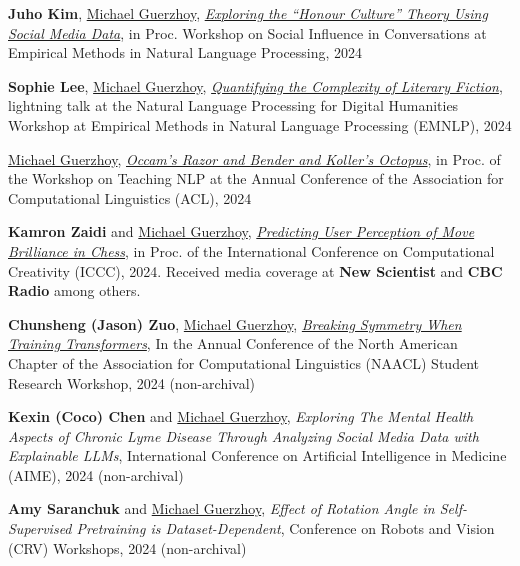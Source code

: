 \documentclass[letterpaper,11pt]{article}
\begin{document}
\begin{revnumerate}
\item \textbf{Juho Kim}, \underline{Michael Guerzhoy}, \href{https://aclanthology.org/2024.sicon-1.1/}{\textit{Exploring the ``Honour Culture'' Theory Using Social Media Data}}, in Proc. Workshop on Social Influence in Conversations at Empirical Methods in Natural Language Processing, 2024 

\item \textbf{Sophie Lee}, \underline{Michael Guerzhoy}, \href{https://zenodo.org/records/14029382}{\textit{Quantifying the Complexity of Literary Fiction}}, lightning talk at the  Natural Language Processing for Digital Humanities Workshop at Empirical Methods in Natural Language Processing (EMNLP), 2024 

\item \underline{Michael Guerzhoy}, \href{https://aclanthology.org/2024.teachingnlp-1.18.pdf}{\textit{Occam's Razor and Bender and Koller's Octopus}}, in Proc. of the Workshop on Teaching NLP at the Annual Conference of the Association for Computational Linguistics (ACL), 2024 

\item \textbf{Kamron Zaidi} and \underline{Michael Guerzhoy}, \href{https://computationalcreativity.net/iccc24/papers/ICCC24_paper_200.pdf}{\textit{Predicting User Perception of Move Brilliance in Chess}}, in Proc. of the International Conference on Computational Creativity (ICCC), 2024. Received media coverage at \textbf{New Scientist} and \textbf{CBC Radio} among others.

\item \textbf{Chunsheng (Jason) Zuo}, \underline{Michael Guerzhoy}, \href{https://arxiv.org/abs/2402.05969}{\textit{Breaking Symmetry When Training Transformers}}, In the Annual Conference of the North American Chapter of the Association for Computational Linguistics (NAACL) Student Research Workshop, 2024 (non-archival)

\item \textbf{Kexin (Coco) Chen} and \underline{Michael Guerzhoy}, \textit{Exploring The Mental Health Aspects of Chronic Lyme Disease Through Analyzing Social Media Data with Explainable LLMs}, International Conference on Artificial Intelligence in Medicine (AIME), 2024 (non-archival)

\item \textbf{Amy Saranchuk} and \underline{Michael Guerzhoy}, \textit{Effect of Rotation Angle in Self-Supervised Pretraining is Dataset-Dependent}, Conference on Robots and Vision (CRV) Workshops, 2024 (non-archival)


\end{revnumerate}
\end{document}
